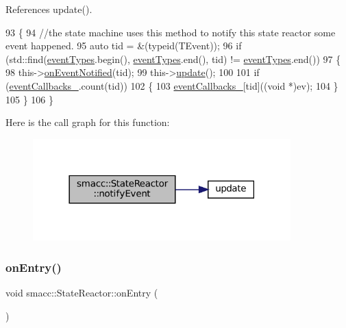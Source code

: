 References update().


\begin{DoxyCode}
93     \{
94         \textcolor{comment}{//the state machine uses this method to notify this state reactor some event happened.}
95         \textcolor{keyword}{auto} tid = &(\textcolor{keyword}{typeid}(TEvent));
96         \textcolor{keywordflow}{if} (std::find(\hyperlink{classsmacc_1_1StateReactor_a65c8ddfce40e7859e5c73fff1cf6c04b}{eventTypes}.begin(), \hyperlink{classsmacc_1_1StateReactor_a65c8ddfce40e7859e5c73fff1cf6c04b}{eventTypes}.end(), tid) != 
      \hyperlink{classsmacc_1_1StateReactor_a65c8ddfce40e7859e5c73fff1cf6c04b}{eventTypes}.end())
97         \{
98             this->\hyperlink{classsmacc_1_1StateReactor_a17646b3c68a6d80d1e4da8c14238ce36}{onEventNotified}(tid);
99             this->\hyperlink{classsmacc_1_1StateReactor_aca5d4f7af06532272db55943b7810a43}{update}();
100 
101             \textcolor{keywordflow}{if} (\hyperlink{classsmacc_1_1StateReactor_a63cce05c412f3699cc1b15af9aeaf8af}{eventCallbacks\_}.count(tid))
102             \{
103                 \hyperlink{classsmacc_1_1StateReactor_a63cce05c412f3699cc1b15af9aeaf8af}{eventCallbacks\_}[tid]((\textcolor{keywordtype}{void} *)ev);
104             \}
105         \}
106     \}
\end{DoxyCode}
Here is the call graph for this function\+:
\nopagebreak
\begin{figure}[H]
\begin{center}
\leavevmode
\includegraphics[width=282pt]{classsmacc_1_1StateReactor_a9e1b551ab97d1c18b2e1bb60a60455da_cgraph}
\end{center}
\end{figure}
\mbox{\label{classsmacc_1_1StateReactor_a11ed02721fd751b8272540645b88f4a6}} 
\subsubsection{\texorpdfstring{on\+Entry()}{onEntry()}}
{\footnotesize\ttfamily void smacc\+::\+State\+Reactor\+::on\+Entry (\begin{DoxyParamCaption}{ }\end{DoxyParamCaption})\hspace{0.3cm}{\ttfamily [virtual]}}



